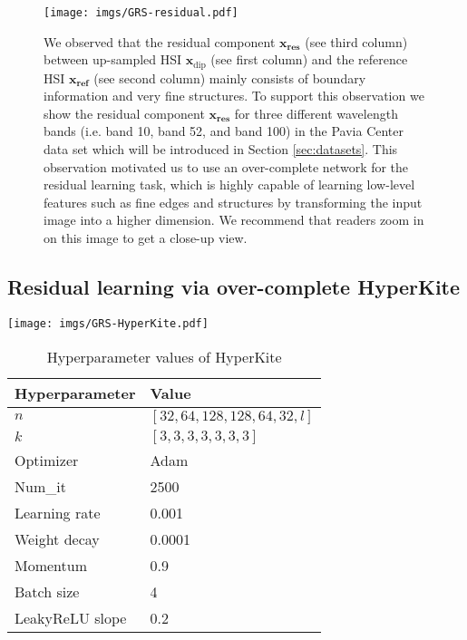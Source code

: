 \documentclass[journal]{IEEEtran}
\begin{document}
    \begin{figure}[tb]
        \centering
        \texttt{[image: imgs/GRS-residual.pdf]}
        \caption{We observed that the residual component $\mathbf{x}_{\textbf{res}}$ (see third column) between up-sampled HSI $\mathbf{x}_{\text{dip}}$ (see first column) and the reference HSI $\mathbf{x}_{\textbf{ref}}$ (see second column) mainly consists of boundary information and very fine structures. To support this observation we show the residual component $\mathbf{x}_{\textbf{res}}$ for three different wavelength bands (i.e. band 10, band 52, and band 100) in the Pavia Center data set which will be introduced in Section \ref{sec:datasets}. 
        This observation motivated us to use an over-complete  network for the residual learning task, which is highly capable of learning low-level features such as fine edges and structures by transforming the input image into a higher dimension. We recommend that readers zoom in on this image to get a close-up view.}
        \label{fig: res_component}
    \end{figure}

\subsection{Residual learning via over-complete HyperKite}
    \label{sec:kiu-net}
    \begin{figure*}[tb]
        \centering
        \texttt{[image: imgs/GRS-HyperKite.pdf]}
        \caption{The proposed HyperKite architecture for the residual prediction task. We denote the  kernel size and the number of filters associated with each convolution block (shown in red color box) as $k[\cdot]$ and $n[\cdot]$, respectively. The values of all hyperparameters for  HyperKite is summarized in Table \ref{tab:HyperKite_hyper}.}
        \label{fig:HyperKite}
    \end{figure*}
    
    \begin{table}[tb]
        \centering
        \caption{Hyperparameter values of HyperKite}
        \begin{tabular}{ll}
            \hline
            Hyperparameter &  Value\\
            \hline
            $n$             & $[32, 64, 128, 128, 64, 32, l]$\\
            $k$             & $[3, 3, 3, 3, 3, 3, 3]$\\
            Optimizer       & Adam\\
            Num\_it         & 2500\\
            Learning rate   & 0.001\\
            Weight decay    & 0.0001\\
            Momentum        & 0.9\\
            Batch size      & 4\\
            LeakyReLU slope & 0.2\\
            \hline
        \end{tabular}
        \label{tab:HyperKite_hyper}
    \end{table}
    
\end{document}
